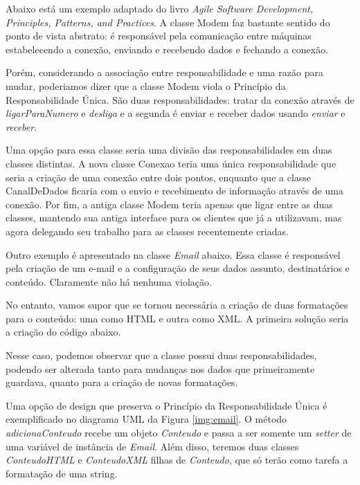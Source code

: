 Abaixo está um exemplo adaptado do livro \textit{Agile Software Development, Principles, Patterns, and
Practices}. A classe Modem faz bastante sentido do ponto de vista abstrato: é responsável pela comunicação entre máquinas estabelecendo a conexão, enviando e recebendo dados e fechando a conexão.



Porém, considerando a associação entre responsabilidade e uma razão para mudar, poderiamos dizer que a classe
Modem viola o Princípio da Responsabilidade Única. São duas responsabilidades: tratar da conexão através de 
\textit{ligarParaNumero} e \textit{desliga} e a segunda é enviar e receber dados usando \textit{enviar} e
\textit{receber}.

Uma opção para essa classe seria uma divisão das responsabilidades em duas classes distintas. A nova classe 
Conexao teria uma única responsabilidade que seria a criação de uma conexão entre dois pontos, enquanto que a 
classe CanalDeDados ficaria com o envio e recebimento de informação através de uma conexão. Por fim, a antiga 
classe Modem teria apenas que ligar entre as duas classes, mantendo sua antiga interface para os clientes que 
já a utilizavam, mas agora delegando seu trabalho para as classes recentemente criadas.

Outro exemplo é apresentado na classe \textit{Email} abaixo. Essa classe é responsável pela criação de um 
e-mail e a configuração de seus dados assunto, destinatários e conteúdo. Claramente não há nenhuma violação.



No entanto, vamos supor que se tornou necessária a criação de duas formatações para o conteúdo: uma como HTML e 
outra como XML. A primeira solução seria a criação do código abaixo.



Nesse caso, podemos observar que a classe possui duas responsabilidades, podendo ser alterada tanto para 
mudanças nos dados que primeiramente guardava, quanto para a criação de novas formatações.

Uma opção de design que preserva o Princípio da Responsabilidade Única é exemplificado no diagrama UML da Figura \ref{img:email}.
O método \textit{adicionaConteudo} recebe um objeto \textit{Conteudo} e passa a ser somente um \textit{setter} de uma variável de instância de \textit{Email}. Além disso, teremos duas classes \textit{ConteudoHTML} e \textit{ConteudoXML} filhas de \textit{Conteudo}, que só terão como tarefa a formatação de uma string.

